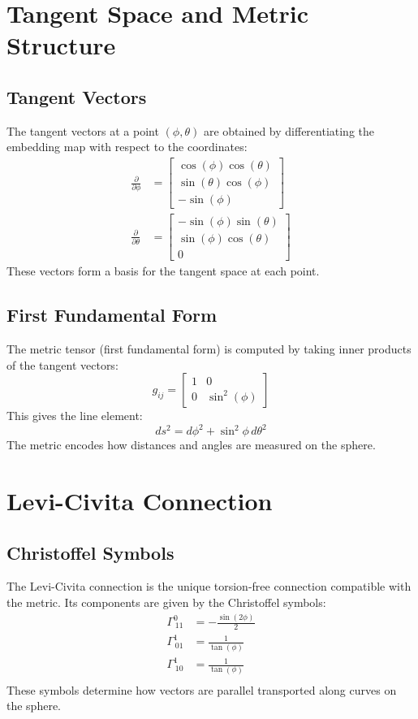 \documentclass[12pt]{article}
\begin{document}
\section{Tangent Space and Metric Structure}
\subsection{Tangent Vectors}
The tangent vectors at a point $(\phi,\theta)$ are obtained by differentiating the embedding map with respect to the coordinates:
\[
\begin{aligned}
\frac{\partial}{\partial \phi} &= \left[\begin{matrix}\cos{\left(\phi \right)} \cos{\left(\theta \right)}\\\sin{\left(\theta \right)} \cos{\left(\phi \right)}\\- \sin{\left(\phi \right)}\end{matrix}\right]\\
\frac{\partial}{\partial \theta} &= \left[\begin{matrix}- \sin{\left(\phi \right)} \sin{\left(\theta \right)}\\\sin{\left(\phi \right)} \cos{\left(\theta \right)}\\0\end{matrix}\right]
\end{aligned}
\]
These vectors form a basis for the tangent space at each point.

\subsection{First Fundamental Form}
The metric tensor (first fundamental form) is computed by taking inner products of the tangent vectors:
\[
g_{ij} = \left[\begin{matrix}1 & 0\\0 & \sin^{2}{\left(\phi \right)}\end{matrix}\right]
\]
This gives the line element:
\[
ds^2 = d\phi^2 + \sin^2\phi\,d\theta^2
\]
The metric encodes how distances and angles are measured on the sphere.

\section{Levi-Civita Connection}
\subsection{Christoffel Symbols}
The Levi-Civita connection is the unique torsion-free connection compatible with the metric. Its components are given by the Christoffel symbols:
\[
\begin{aligned}
\Gamma^0_{\,11} &= - \frac{\sin{\left(2 \phi \right)}}{2} \\
\Gamma^1_{\,01} &= \frac{1}{\tan{\left(\phi \right)}} \\
\Gamma^1_{\,10} &= \frac{1}{\tan{\left(\phi \right)}} \\
\end{aligned}
\]
These symbols determine how vectors are parallel transported along curves on the sphere.
\end{document}
